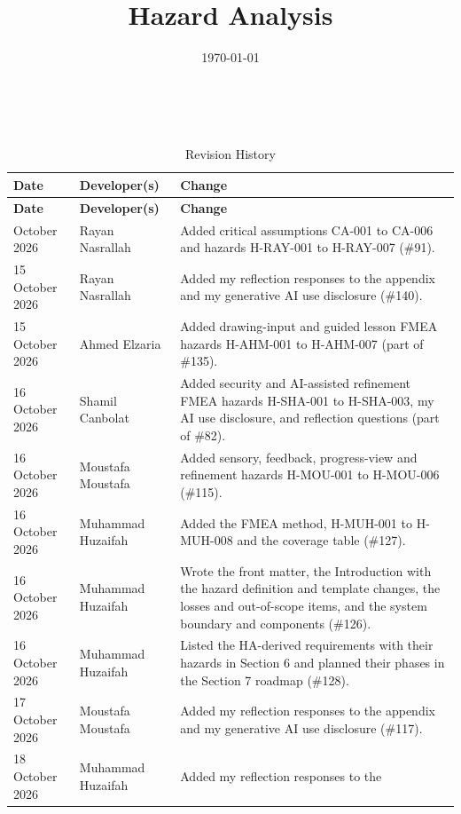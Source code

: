 \documentclass{article}
\title{Hazard Analysis\\\progname}
\author{\authname}
\date{\today}
\begin{document}
\maketitle
\thispagestyle{empty}

~\newpage


\begin{longtable}{@{}p{2.5cm}p{3.5cm}%
  >{\raggedright\arraybackslash}p{\dimexpr\textwidth-6cm-4\tabcolsep\relax}@{}}
\caption{Revision History} \label{TblRevisionHistory}\\
\toprule
\textbf{Date} & \textbf{Developer(s)} & \textbf{Change}\\
\midrule
\endfirsthead
\toprule
\textbf{Date} & \textbf{Developer(s)} & \textbf{Change}\\
\midrule
\endhead
\bottomrule
\endlastfoot
14 October 2026 & Rayan Nasrallah & Added critical assumptions CA-001 to CA-006
and hazards H-RAY-001 to H-RAY-007 (\#91).\\
15 October 2026 & Rayan Nasrallah & Added my reflection responses to the
appendix and my generative AI use disclosure (\#140).\\
15 October 2026 & Ahmed Elzaria & Added drawing-input and guided lesson FMEA
hazards H-AHM-001 to H-AHM-007 (part of \#135).\\
16 October 2026 & Shamil Canbolat & Added security and AI-assisted refinement
FMEA hazards H-SHA-001 to H-SHA-003, my AI use disclosure, and reflection
questions (part of \#82).\\
16 October 2026 & Moustafa Moustafa & Added sensory, feedback, progress-view and
refinement hazards H-MOU-001 to H-MOU-006 (\#115).\\
16 October 2026 & Muhammad Huzaifah & Added the FMEA method, H-MUH-001 to
H-MUH-008 and the coverage table (\#127).\\
16 October 2026 & Muhammad Huzaifah & Wrote the front matter, the Introduction
with the hazard definition and template changes, the losses and out-of-scope
items, and the system boundary and components (\#126).\\
16 October 2026 & Muhammad Huzaifah & Listed the HA-derived requirements with
their hazards in Section 6 and planned their phases in the Section 7 roadmap
(\#128).\\
17 October 2026 & Moustafa Moustafa & Added my reflection responses to the
appendix and my generative AI use disclosure (\#117).\\
18 October 2026 & Muhammad Huzaifah & Added my reflection responses to the

\end{longtable}
\end{document}
